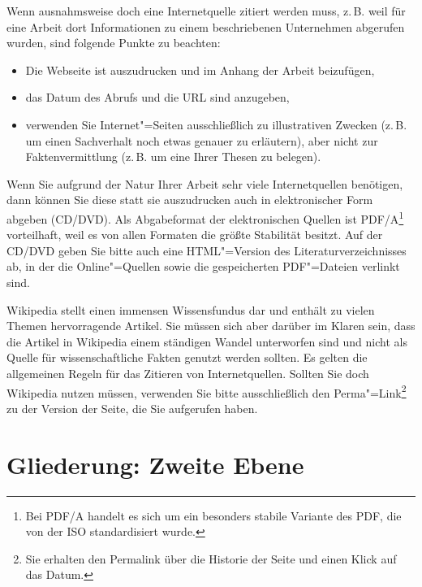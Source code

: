 Wenn ausnahmsweise doch eine Internetquelle zitiert werden muss, z.\,B. weil für eine Arbeit dort Informationen zu einem beschriebenen Unternehmen abgerufen wurden, sind folgende Punkte zu beachten:

\begin{itemize}
\item Die Webseite ist auszudrucken und im Anhang der Arbeit beizufügen,
\item das Datum des Abrufs und die URL sind anzugeben,
\item verwenden Sie Internet"=Seiten ausschließlich zu illustrativen Zwecken (z.\,B. um einen Sachverhalt noch etwas genauer zu erläutern), aber nicht zur Faktenvermittlung (z.\,B. um eine Ihrer Thesen zu belegen).
\end{itemize}

Wenn Sie aufgrund der Natur Ihrer Arbeit sehr viele Internetquellen benötigen, dann können Sie diese statt sie auszudrucken auch in elektronischer Form abgeben (CD/DVD). Als Abgabeformat der elektronischen Quellen ist PDF/A\footnote{Bei PDF/A handelt es sich um ein besonders stabile Variante des \ac{PDF}, die von der  \ac{ISO} standardisiert wurde.} vorteilhaft, weil es von allen Formaten die größte Stabilität besitzt.
Auf der CD/DVD geben Sie bitte auch eine HTML"=Version des Literaturverzeichnisses ab, in der die Online"=Quellen sowie die gespeicherten PDF"=Dateien verlinkt sind.

Wikipedia stellt einen immensen Wissensfundus dar und enthält zu vielen Themen hervorragende Artikel. Sie müssen sich aber darüber im Klaren sein, dass die Artikel in Wikipedia einem ständigen Wandel unterworfen sind und nicht als Quelle für wissenschaftliche Fakten genutzt werden sollten. Es gelten die allgemeinen Regeln für das Zitieren von Internetquellen. Sollten Sie doch Wikipedia nutzen müssen, verwenden Sie bitte ausschließlich den Perma"=Link\footnote{Sie erhalten den Permalink über die Historie der Seite und einen Klick auf das Datum.} zu der Version der Seite, die Sie aufgerufen haben.


\section{Gliederung: Zweite Ebene}

